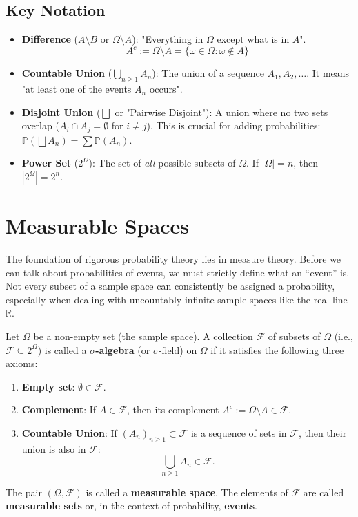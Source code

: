 \subsection{Key Notation}
\begin{itemize}
    \item \textbf{Difference} ($A \setminus B$ or $\Omega \setminus A$): "Everything in $\Omega$ except what is in $A$".
    \[ A^c := \Omega \setminus A = \{ \omega \in \Omega : \omega \notin A \} \]
    \item \textbf{Countable Union} ($\bigcup_{n \ge 1} A_n$): The union of a sequence $A_1, A_2, \dots$. It means "at least one of the events $A_n$ occurs".
    \item \textbf{Disjoint Union} ($\bigsqcup$ or "Pairwise Disjoint"): A union where no two sets overlap ($A_i \cap A_j = \emptyset$ for $i \neq j$). This is crucial for adding probabilities: $\mathbb{P}(\bigsqcup A_n) = \sum \mathbb{P}(A_n)$.
    \item \textbf{Power Set} ($2^\Omega$): The set of \textit{all} possible subsets of $\Omega$. If $|\Omega| = n$, then $|2^\Omega| = 2^n$.
\end{itemize}

\section{Measurable Spaces}

The foundation of rigorous probability theory lies in measure theory. Before we can talk about probabilities of events, we must strictly define what an ``event'' is. Not every subset of a sample space can consistently be assigned a probability, especially when dealing with uncountably infinite sample spaces like the real line $\mathbb{R}$.

\begin{definition}
Let $\Omega$ be a non-empty set (the sample space). A collection $\mathcal{F}$ of subsets of $\Omega$ (i.e., $\mathcal{F} \subseteq 2^{\Omega}$) is called a \textbf{\texorpdfstring{$\sigma$-}{sigma-}algebra} (or \texorpdfstring{$\sigma$-}{sigma-}field) on $\Omega$ if it satisfies the following three axioms:
\begin{enumerate}
    \item \textbf{Empty set}: $\emptyset \in \mathcal{F}$.
    \item \textbf{Complement}: If $A \in \mathcal{F}$, then its complement $A^c := \Omega \setminus A \in \mathcal{F}$.
    \item \textbf{Countable Union}: If $(A_n)_{n \geq 1} \subset \mathcal{F}$ is a sequence of sets in $\mathcal{F}$, then their union is also in $\mathcal{F}$:
    \[
    \bigcup_{n \geq 1} A_n \in \mathcal{F}.
    \]
\end{enumerate}
The pair $(\Omega, \mathcal{F})$ is called a \textbf{measurable space}. The elements of $\mathcal{F}$ are called \textbf{measurable sets} or, in the context of probability, \textbf{events}.
\end{definition}

